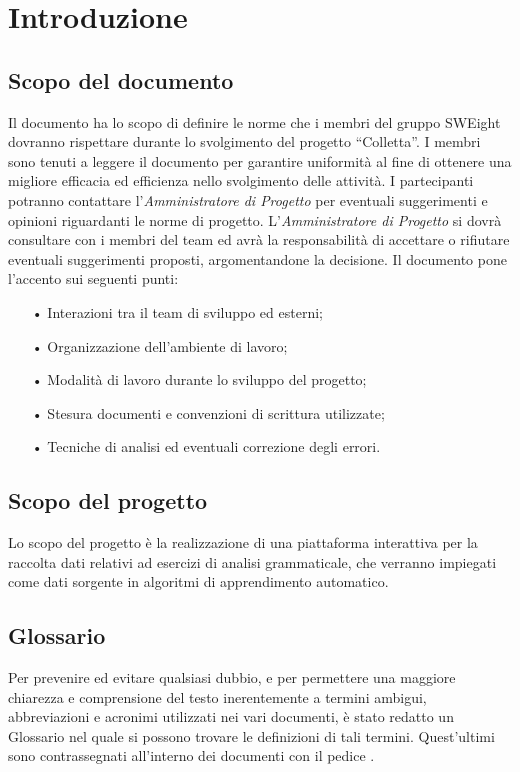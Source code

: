 \section{Introduzione}
\subsection{Scopo del documento}
Il documento ha lo scopo di definire le norme che i membri del gruppo SWEight dovranno rispettare durante lo svolgimento del progetto “Colletta”. 
I membri sono tenuti a leggere il documento per garantire uniformità al fine di ottenere una migliore efficacia ed efficienza nello svolgimento delle attività. I partecipanti potranno contattare l'\textit{Amministratore di Progetto} per eventuali suggerimenti e opinioni riguardanti le norme di progetto. 
L'\textit{Amministratore di Progetto} si dovrà consultare con i membri del team ed avrà la responsabilità di accettare o rifiutare eventuali suggerimenti proposti, argomentandone la decisione.
Il documento pone l'accento sui seguenti punti:
\begin{itemize}
\item[•] Interazioni tra il team di sviluppo ed esterni;
\item[•] Organizzazione dell'ambiente di lavoro;
\item[•] Modalità di lavoro durante lo sviluppo del progetto;
\item[•] Stesura documenti e convenzioni di scrittura utilizzate;
\item[•] Tecniche di analisi ed eventuali correzione degli errori.
\end{itemize}
\subsection{Scopo del progetto}
Lo scopo del progetto è la realizzazione di una piattaforma interattiva per la raccolta dati relativi ad esercizi di analisi grammaticale, che verranno impiegati come dati sorgente in algoritmi di apprendimento automatico. %
\subsection{Glossario}
Per prevenire ed evitare qualsiasi dubbio, e per permettere una maggiore chiarezza e comprensione del testo inerentemente a termini ambigui, abbreviazioni e acronimi utilizzati nei vari documenti, è stato redatto un Glossario nel quale si possono trovare le definizioni di tali termini. Quest'ultimi sono contrassegnati all'interno dei documenti con il pedice .
